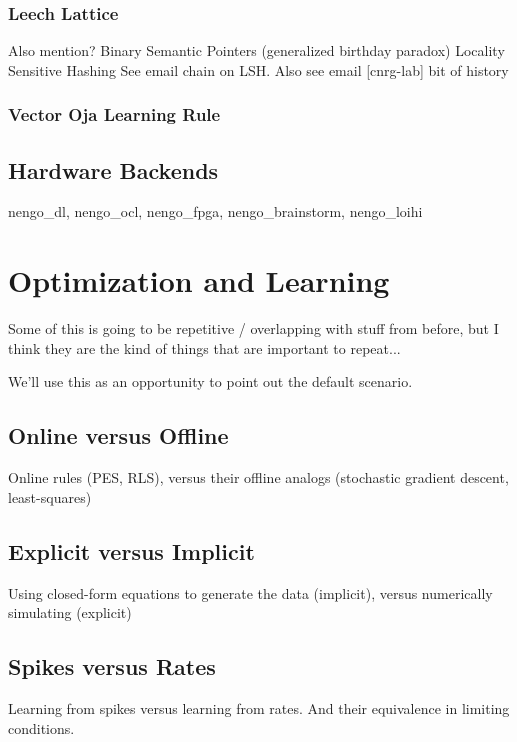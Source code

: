 \subsubsection{Leech Lattice}

Also mention?
Binary Semantic Pointers (generalized birthday paradox)
Locality Sensitive Hashing
See email chain on LSH. Also see email [cnrg-lab] bit of history

\subsubsection{Vector Oja Learning Rule}


\subsection{Hardware Backends}

nengo\_dl, nengo\_ocl, nengo\_fpga, nengo\_brainstorm, nengo\_loihi


\section{Optimization and Learning}

Some of this is going to be repetitive / overlapping with stuff from before, but I think they are the kind of things that are important to repeat...

We'll use this as an opportunity to point out the default scenario.

\subsection{Online versus Offline}

Online rules (PES, RLS), versus their offline analogs (stochastic gradient descent, least-squares)

\subsection{Explicit versus Implicit}

Using closed-form equations to generate the data (implicit), versus numerically simulating (explicit)

\subsection{Spikes versus Rates}

Learning from spikes versus learning from rates. And their equivalence in limiting conditions.

